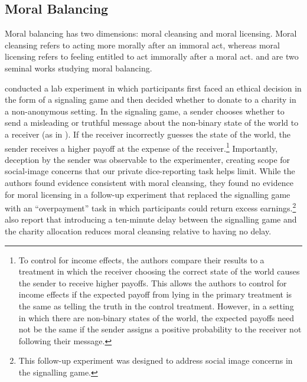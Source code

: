 \documentclass{article}
\begin{document}
\subsection{Moral Balancing}
Moral balancing has two dimensions: moral cleansing and moral licensing. Moral cleansing refers to acting more morally after an immoral act, whereas moral licensing refers to feeling entitled to act immorally after a moral act. \textcite{Gneezy2014} and \textcite{Ploner2013} are two seminal works studying moral balancing. 
\par
\textcite{Gneezy2014} conducted a lab experiment in which participants first faced an ethical decision in the form of a signaling game and then decided whether to donate to a charity in a non-anonymous setting. In the signaling game, a sender chooses whether to send a misleading or truthful message about the non-binary state of the world to a receiver (as in \cite{Gneezy2005}). If the receiver incorrectly guesses the state of the world, the sender receives a higher payoff at the expense of the receiver.\footnote{To control for income effects, the authors compare their results to a treatment in which the receiver choosing the correct state of the world causes the sender to receive higher payoffs. This allows the authors to control for income effects if the expected payoff from lying in the primary treatment is the same as telling the truth in the control treatment. However, in a setting in which there are non-binary states of the world, the expected payoffs need not be the same if the sender assigns a positive probability to the receiver not following their message.} Importantly, deception by the sender was observable to the experimenter, creating scope for social-image concerns that our private dice-reporting task helps limit. While the authors found evidence consistent with moral cleansing, they found no evidence for moral licensing in a follow-up experiment that replaced the signalling game with an ``overpayment'' task in which participants could return excess earnings.\footnote{This follow-up experiment was designed to address social image concerns in the signalling game.} \textcite{Gneezy2014} also report that introducing a ten-minute delay between the signalling game and the charity allocation reduces moral cleansing relative to having no delay. 
\par
\end{document}
